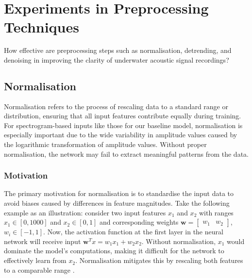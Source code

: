\chapter{Experiments in Preprocessing Techniques}


\begin{researchquestion}
How effective are preprocessing steps such as normalisation, detrending, and denoising in improving the clarity of underwater acoustic signal recordings?
\end{researchquestion}

\section{Normalisation}

Normalisation refers to the process of rescaling data to a standard range or distribution, ensuring that all input features contribute equally during training. For spectrogram-based inputs like those for our baseline model, normalisation is especially important due to the wide variability in amplitude values caused by the logarithmic transformation of amplitude values. Without proper normalisation, the network may fail to extract meaningful patterns from the data.

\subsection{Motivation}

The primary motivation for normalisation is to standardise the input data to avoid biases caused by differences in feature magnitudes. Take the following example as an illustration: consider two input features $x_1$ and $x_2$ with ranges $x_1 \in [0, 1000]$ and $x_2 \in [0, 1]$ and corresponding weights $\bm{w} = \begin{bmatrix} w_1 & w_2 \end{bmatrix}$, $w_i \in [-1, 1]$. Now, the activation function at the first layer in the neural network will receive input $\bm{w}^T x = w_1x_1 + w_2x_2$. Without normalisation, $x_1$ would dominate the model's computations, making it difficult for the network to effectively learn from $x_2$. Normalisation mitigates this by rescaling both features to a comparable range \cite{gunes_answer_2020}.


